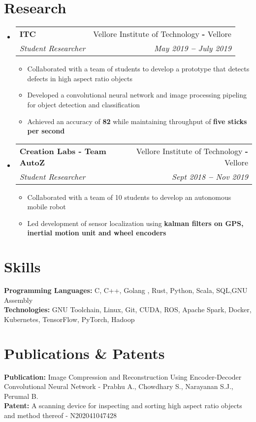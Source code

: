 \documentclass[12pt]{article}
\makeatletter
\newcommand{\resumeItem}[1]{
  \item\small{
    {#1}
  } 
  \vspace{-3pt}
}
\newcommand{\resumeSubheading}[4]{
  \item
    \begin{tabular*}{0.97\textwidth}[t]{l@{\extracolsep{\fill}}r}
      \textbf{\small#1} & \small#2 \\
      \textit{\small#3} & \textit{\small #4} \\
    \end{tabular*}
}
\newcommand{\resumeSubHeadingListStart}{\begin{itemize}[leftmargin=0.15in, label={}]}
\newcommand{\resumeSubHeadingListEnd}{\end{itemize}}
\newcommand{\resumeItemListStart}{\begin{itemize}\vspace{-8pt}}
\newcommand{\resumeItemListEnd}{\end{itemize}\vspace{-8pt}}
\makeatother
\begin{document}
\section{Research}
  \resumeSubHeadingListStart
    \resumeSubheading
      {ITC}{ Vellore Institute of Technology  \textbf{-} Vellore}
      {Student Researcher}{May 2019 \textbf{--}  July 2019}
        \resumeItemListStart
            \resumeItem{Collaborated with a team of students to develop a prototype that detects defects in high aspect ratio objects}
            \resumeItem{Developed a convolutional neural network and image processing pipeling for object detection and classification}
            \resumeItem{Achieved an accuracy of \textbf{82\symbol{\%}} while maintaining throughput of \textbf{five sticks per second}}
            \resumeItemListEnd
    \resumeSubheading
      {Creation Labs - Team AutoZ}{Vellore Institute of Technology \textbf{-} Vellore}
      {Student Researcher}{Sept 2018 \textbf{--}  Nov 2019}
        \resumeItemListStart
            \resumeItem{Collaborated with a team of 10 students to develop an autonomous mobile robot}
            \resumeItem{Led development of sensor localization using \textbf{kalman filters on GPS, inertial motion unit and wheel encoders}}
            \resumeItemListEnd
  \resumeSubHeadingListEnd
    \vspace{0pt}


\section{Skills}
  \resumeSubHeadingListStart
    \small{\item{
        \textbf{Programming Languages: }{C, C++, Golang , Rust, Python, Scala, SQL,GNU Assembly} \\
        \textbf{Technologies: }{GNU Toolchain, Linux, Git, CUDA, ROS, Apache Spark, Docker, Kubernetes, TensorFlow, PyTorch, Hadoop} \\
      }}
  \resumeSubHeadingListEnd


  \section{Publications \& Patents}
  \resumeSubHeadingListStart
    \small{\item{
        \textbf{Publication:}{ Image Compression and Reconstruction Using Encoder-Decoder Convolutional Neural Network - Prabhu A., Chowdhary S., Narayanan S.J., Perumal B.} \\ 
        \textbf{Patent:}{ A scanning device for inspecting and sorting high aspect ratio objects and method thereof - N202041047428} 
      }}
  \resumeSubHeadingListEnd
\end{document}
